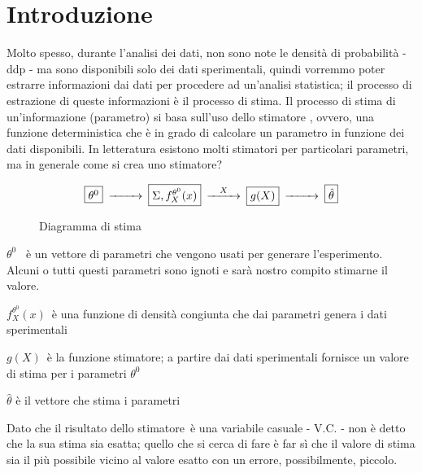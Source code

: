 \section{Introduzione}

Molto spesso, durante l'analisi dei dati, non sono note le densità di probabilità - ddp - ma sono disponibili solo dei dati sperimentali, quindi vorremmo poter estrarre informazioni dai dati per procedere ad un'analisi statistica; il processo di estrazione di queste informazioni è il processo di stima. Il processo di stima di un'informazione (parametro) si basa sull'uso dello stimatore , ovvero, una funzione deterministica che è in grado di calcolare un parametro in funzione dei dati disponibili. In letteratura esistono molti stimatori per particolari parametri, ma in generale come si crea uno stimatore?

\begin{figure}[htbp]
  \centering
  \[
    \begin{CD}
      \framebox{$\theta^0$} @>>> \framebox{$\Sigma, f_X^{\theta^0}(x)$} @>X>> \framebox{$g(X)$} @>>> \framebox{$\hat{\theta}$}
    \end{CD}
  \]
  \caption{Diagramma di stima\label{fig:diagrammastima}}
\end{figure}



$\theta^0$  è un vettore di parametri  che vengono usati per generare l'esperimento. Alcuni o tutti questi parametri sono ignoti e sarà nostro compito stimarne il valore. \newline

$f_X^{\theta^0}(x)$ è una funzione di densità congiunta che dai parametri genera i dati sperimentali \newline

$g(X)$ è la funzione stimatore; a partire dai dati sperimentali fornisce un valore di stima per i parametri $\theta^0$ \newline

$\hat{\theta}$ è il vettore che stima i parametri

Dato che il risultato dello stimatore è una variabile casuale - V.C. - non è detto che la sua stima sia esatta; quello che si cerca di fare è far sì che il valore di stima sia il più possibile vicino al valore esatto con un errore, possibilmente, piccolo.

